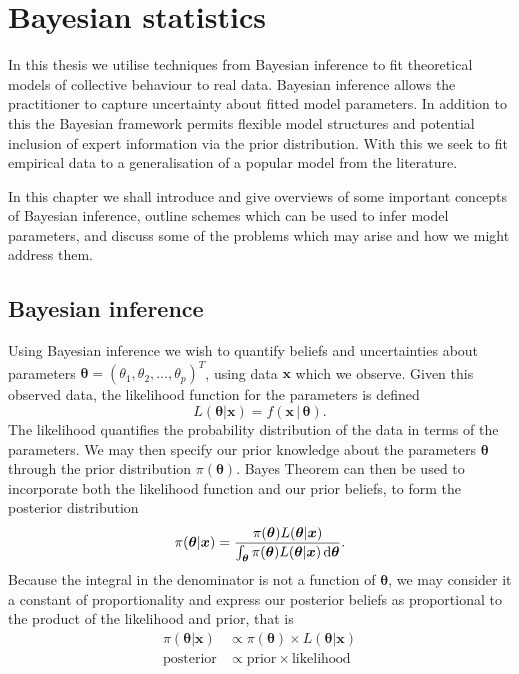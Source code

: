 \chapter{Bayesian statistics}	
\label{cha:bayes_intro}
In this thesis we utilise techniques from Bayesian inference to fit theoretical models of collective behaviour to real data. Bayesian inference allows the practitioner to capture uncertainty about fitted model parameters. In addition to this the Bayesian framework permits flexible model structures and potential inclusion of expert information via the prior distribution. With this we seek to fit empirical data to a generalisation of a popular model from the literature.

In this chapter we shall introduce and give overviews of some important concepts of Bayesian inference, outline schemes which can be used to infer model parameters, and discuss some of the problems which may arise and how we might address them.

\section{Bayesian inference}
\label{sec:bayesian_inference}
Using Bayesian inference we wish to quantify beliefs and uncertainties about parameters $\bm{\theta} = (\theta_1, \theta_2,\dots,\theta_p)^T$, using data $\bm{x}$ which we observe. Given this observed data, the likelihood function for the parameters is defined
\[
    L(\bm{\theta}|\bm{x}) = f(\bm{x}\, | \,\bm{\theta}).
\]
The likelihood quantifies the probability distribution of the data in terms of the parameters. We may then specify our prior knowledge about the parameters $\bm{\theta}$ through the prior distribution $\pi(\bm{\theta})$. Bayes Theorem can then be used to incorporate both the likelihood function and our prior beliefs, to form the posterior distribution
\begin{equation}
\label{eq:bayes_theorem}
    \pi(\bm{\theta}|\bm{x}) = \frac{\pi({\bm{\theta}})L(\bm{\theta}|\bm{x})}{\int_{\bm{\theta}} \pi(\bm{\theta})L(\bm{\theta}|\bm{x}) \, \textup{d}\bm{\theta}}.
\end{equation}
Because the integral in the denominator is not a function of $\bm{\theta}$, we may consider it a constant of proportionality and express our posterior beliefs as proportional to the product of the likelihood and prior, that is
\begin{align*}
    \pi(\bm{\theta}|\bm{x}) &\propto \pi(\bm{\theta}) \times L(\bm{\theta}|\bm{x})\\
    \text{posterior} &\propto \text{prior} \times \text{likelihood}
\end{align*}

